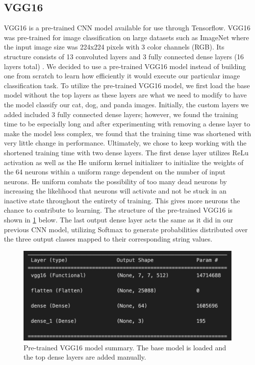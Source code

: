 \subsection{VGG16}
VGG16 is a pre-trained CNN model available for use through Tensorflow. VGG16 was pre-trained for image classification on large datasets such as ImageNet where the input image size was 224x224 pixels with 3 color channels (RGB). Its structure consists of 13 convoluted layers and 3 fully connected dense layers (16 layers total) \cite{VGG16Explained}. We decided to use a pre-trained VGG16 model instead of building one from scratch to learn how efficiently it would execute our particular image classification task. 
To utilize the pre-trained VGG16 model, we first load the base model without the top layers as these layers are what we need to modify to have the model classify our cat, dog, and panda images. Initially, the custom layers we added included 3 fully connected dense layers; however, we found the training time to be especially long and after experimenting with removing a dense layer to make the model less complex, we found that the training time was shortened with very little change in performance. Ultimately, we chose to keep working with the shortened training time with two dense layers. The first dense layer utilizes ReLu activation as well as the He uniform kernel initializer to initialize the weights of the 64 neurons within a uniform range dependent on the number of input neurons. He uniform combats the possibility of too many dead neurons by increasing the likelihood that neurons will activate and not be stuck in an inactive state throughout the entirety of training. This gives more neurons the chance to contribute to learning. The structure of the pre-trained VGG16 is shown in \ref{fig:figure2} below. The last output dense layer acts the same as it did in our previous CNN model, utilizing Softmax to generate probabilities distributed over the three output classes mapped to their corresponding string values. 

\begin{figure}[h]
	\centering
	\includegraphics[scale=0.5]{VGG16_structure}
	\caption{Pre-trained VGG16 model summary. The base model is loaded and the top dense layers are added manually.}
	\label{fig:figure2}
\end{figure}